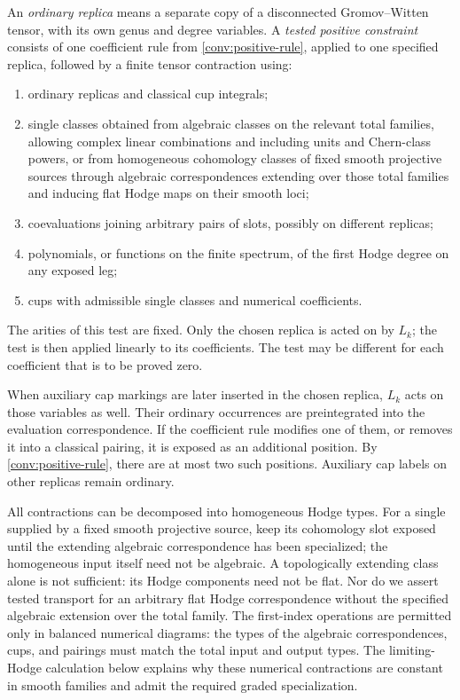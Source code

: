 An \emph{ordinary replica} means a separate copy of a disconnected Gromov--Witten tensor, with its own genus and degree variables. A \emph{tested positive constraint} consists of one coefficient rule from \cref{conv:positive-rule}, applied to one specified replica, followed by a finite tensor contraction using:
\begin{enumerate}[label=\textup{(\alph*)}]
\item ordinary replicas and classical cup integrals;
\item single classes obtained from algebraic classes on the relevant total families, allowing complex linear combinations and including units and Chern-class powers, or from homogeneous cohomology classes of fixed smooth projective sources through algebraic correspondences extending over those total families and inducing flat Hodge maps on their smooth loci;
\item coevaluations joining arbitrary pairs of slots, possibly on different replicas;
\item polynomials, or functions on the finite spectrum, of the first Hodge degree on any exposed leg;
\item cups with admissible single classes and numerical coefficients.
\end{enumerate}
The arities of this test are fixed. Only the chosen replica is acted on by \(L_k\); the test is then applied linearly to its coefficients. The test may be different for each coefficient that is to be proved zero.

When auxiliary cap markings are later inserted in the chosen replica, \(L_k\) acts on those variables as well. Their ordinary occurrences are preintegrated into the evaluation correspondence. If the coefficient rule modifies one of them, or removes it into a classical pairing, it is exposed as an additional position. By \cref{conv:positive-rule}, there are at most two such positions. Auxiliary cap labels on other replicas remain ordinary.

All contractions can be decomposed into homogeneous Hodge types. For a single supplied by a fixed smooth projective source, keep its cohomology slot exposed until the extending algebraic correspondence has been specialized; the homogeneous input itself need not be algebraic. A topologically extending class alone is not sufficient: its Hodge components need not be flat. Nor do we assert tested transport for an arbitrary flat Hodge correspondence without the specified algebraic extension over the total family. The first-index operations are permitted only in balanced numerical diagrams: the types of the algebraic correspondences, cups, and pairings must match the total input and output types. The limiting-Hodge calculation below explains why these numerical contractions are constant in smooth families and admit the required graded specialization.

